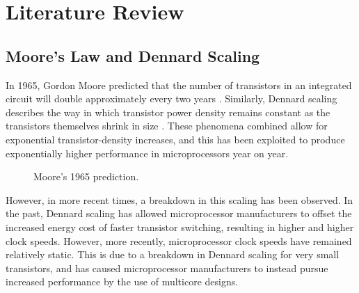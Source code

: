 \documentclass{UoYCSproject}
\begin{document}
\chapter{Literature Review}

\section{Moore's Law and Dennard Scaling}

In 1965, Gordon Moore predicted that the number of transistors in an integrated circuit will double
approximately every two years  \cite{moore}. Similarly, Dennard scaling describes the way in which transistor power density
remains constant as the transistors themselves shrink in size \cite{dennard}. These phenomena combined allow for exponential
transistor-density increases, and this has been exploited to produce exponentially higher performance in
microprocessors year on year.

\begin{figure}[h]
\caption{Moore's 1965 prediction. \cite{moore}}
\end{figure}

However, in more recent times, a breakdown in this scaling has been observed. In the past, Dennard scaling has allowed
microprocessor manufacturers to offset the increased energy cost of faster transistor switching, resulting in higher
and higher clock speeds. However, more recently, microprocessor clock speeds have remained relatively static. This is
due to a breakdown in Dennard scaling for very small transistors, and has caused microprocessor manufacturers to instead
pursue increased performance by the use of multicore designs.
\end{document}
